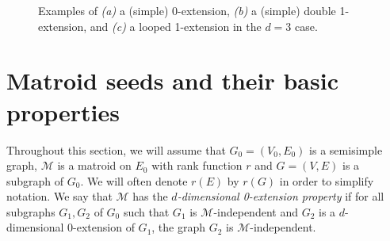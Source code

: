 \documentclass[11pt,a4paper,dvipsnames]{scrartcl}
\def\normaledge{1.2}
\newcommand{\cM}{{\mathcal{M}}}
\begin{document}
\begin{figure}[t]
\begin{subfigure}[b]{0.32\linewidth}
        \caption{}
    \end{subfigure}
    \caption{Examples of \emph{(a)} a (simple) 0-extension, \emph{(b)} a (simple) double 1-extension, and \emph{(c)} a looped 1-extension in the $d=3$ case.}\label{fig:operations}
\end{figure}


\section{Matroid seeds and their basic properties}


Throughout this section, we will assume that 
$G_0=(V_0,E_0)$ is a semisimple graph,  $\cM$ is a matroid on $E_0$ with rank function $r$ and $G=(V,E)$ is a subgraph of $G_0$. We will often denote $r(E)$ by $r(G)$ in order to simplify notation. We say that $\cM$ has the {\em $d$-dimensional 0-extension property} if for all subgraphs $G_1,G_2$ of $G_0$ such that $G_1$ is $\cM$-independent and $G_2$ is a $d$-dimensional 0-extension of $G_1$, the graph $G_2$ is $\cM$-independent.
\end{document}
